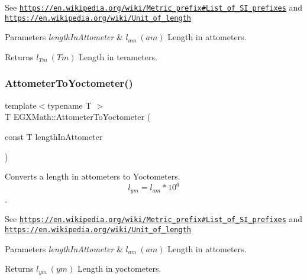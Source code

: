 See \href{https://en.wikipedia.org/wiki/Metric_prefix#List_of_SI_prefixes}{\tt https\+://en.\+wikipedia.\+org/wiki/\+Metric\+\_\+prefix\#\+List\+\_\+of\+\_\+\+S\+I\+\_\+prefixes} and \href{https://en.wikipedia.org/wiki/Unit_of_length}{\tt https\+://en.\+wikipedia.\+org/wiki/\+Unit\+\_\+of\+\_\+length} 
\begin{DoxyParams}{Parameters}
{\em length\+In\+Attometer} & $ l_{am}\ (am)$ Length in attometers. \\
\hline
\end{DoxyParams}
\begin{DoxyReturn}{Returns}
$ l_{Tm}\ (Tm)$ Length in terameters. 
\end{DoxyReturn}
\mbox{\label{group___e_g_x_math-_conversions-_length_conversions-_attometer-_s_i_gaf325d426b8544c973b0f140b0d4e0f06}} 
\subsubsection{\texorpdfstring{Attometer\+To\+Yoctometer()}{AttometerToYoctometer()}}
{\footnotesize\ttfamily template$<$typename T $>$ \\
T E\+G\+X\+Math\+::\+Attometer\+To\+Yoctometer (\begin{DoxyParamCaption}\item[{const T}]{length\+In\+Attometer }\end{DoxyParamCaption})}



Converts a length in attometers to Yoctometers. \[ l_{ym}=l_{am} * 10^{6} \]. 

See \href{https://en.wikipedia.org/wiki/Metric_prefix#List_of_SI_prefixes}{\tt https\+://en.\+wikipedia.\+org/wiki/\+Metric\+\_\+prefix\#\+List\+\_\+of\+\_\+\+S\+I\+\_\+prefixes} and \href{https://en.wikipedia.org/wiki/Unit_of_length}{\tt https\+://en.\+wikipedia.\+org/wiki/\+Unit\+\_\+of\+\_\+length} 
\begin{DoxyParams}{Parameters}
{\em length\+In\+Attometer} & $ l_{am}\ (am)$ Length in attometers. \\
\hline
\end{DoxyParams}
\begin{DoxyReturn}{Returns}
$ l_{ym}\ (ym)$ Length in yoctometers. 
\end{DoxyReturn}
\mbox{\label{group___e_g_x_math-_conversions-_length_conversions-_attometer-_s_i_gaaa5d4078879169021c8f2857c02a7aed}} 
